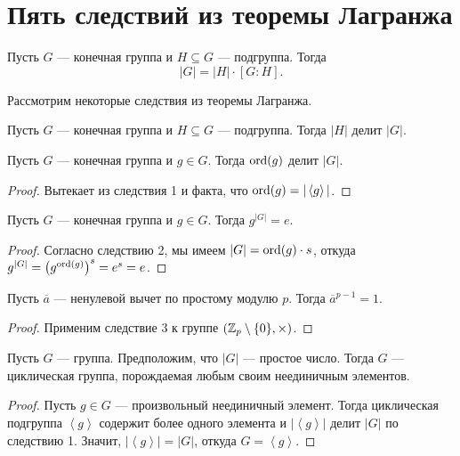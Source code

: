 \section{Пять следствий из теоремы Лагранжа}

\begin{theorem}
    Пусть $G$ --- конечная группа и $H \subseteq G$ --- подгруппа. Тогда
    \begin{equation*}
        |G| = |H| \cdot \left[G : H\right]
    .\end{equation*}
\end{theorem}

Рассмотрим некоторые следствия из теоремы Лагранжа.

\begin{corollary}
    Пусть $G$ --- конечная группа и $H \subseteq G$ --- подгруппа. Тогда $|H|$ делит $|G|$.
\end{corollary}

\begin{corollary}
    Пусть $G$ --- конечная группа и $g \in G$. Тогда $\operatorname{\mathop{\mathrm{ord}}}(g)$ делит $|G|$.
\end{corollary}

\begin{proof}
    Вытекает из следствия 1 и факта, что $\operatorname{\mathop{\mathrm{ord}}}(g) = |\left< g \right>|$.
\end{proof}

\begin{corollary}
    Пусть $G$ --- конечная группа и $g \in G$. Тогда $g^{|G|} = e$.
\end{corollary}

\begin{proof}
    Согласно следствию 2, мы имеем $|G| = \operatorname{\mathop{\mathrm{ord}}}(g) \cdot s$, откуда $g^{|G|} = \left(g^{\operatorname{\mathop{\mathrm{ord}}}(g)}\right)^{s} = e^{s} = e$.
\end{proof}

\begin{corollary}
    Пусть $\overline{a}$ --- ненулевой вычет по простому модулю $p$. Тогда $\overline{a}^{p - 1} = 1$.
\end{corollary}

\begin{proof}
    Применим следствие 3 к группе $(\mathbb{Z}_p \setminus \{0\}, \times)$.
\end{proof}

\begin{corollary}
    Пусть $G$ --- группа. Предположим, что $|G|$ --- простое число. Тогда $G$ --- циклическая группа, порождаемая любым своим неединичным элементов.
\end{corollary}

\begin{proof}
    Пусть $g \in G$ --- произвольный неединичный элемент. Тогда циклическая подгруппа $\left< g \right>$ содержит более одного элемента и $\left|\left< g \right>\right|$ делит $|G|$ по следствию 1. Значит, $\left|\left< g \right>\right| = |G|$, откуда $G = \left< g \right>$.
\end{proof}
